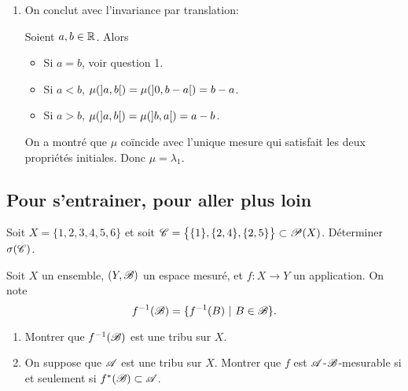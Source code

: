 {\begin{td-sol}[]
\begin{enumerate}
            On a montré que \(\mu(\fo{0,x})=x\) pour tout \(x\in\R_+^*\).

            \item On conclut avec l'invariance par translation:

            Soient \(a,b\in\mathbb{R}\). Alors
            \begin{itemize}
                \item Si \(a=b\), voir question 1.
                \item Si \(a<b\), \(\mu(\mathopen{}\left]a,b\right[\mathclose{})=\mu(\mathopen{}\left]0,b-a\right[\mathclose{})=b-a\).
                \item Si \(a>b\), \(\mu(\mathopen{}\left]a,b\right[\mathclose{})=\mu(\mathopen{}\left]b,a\right[\mathclose{})=a-b\).
            \end{itemize}
            On a montré que \(\mu\) coïncide avec l'unique mesure qui satisfait les deux propriétés initiales.
            Donc \(\mu=\lambda_1\).
        \end{enumerate}

    \end{td-sol}
}{}

%
\subsection{Pour s'entrainer, pour aller plus loin} 
%

%

\begin{td-exo}
    Soit \(X=\{1,2,3,4,5,6\}\) et soit \(\mathscr{C}=\bigl\{\{1\},\{2,4\},\{2,5\}\bigr\}\subset\mathscr{P}(X)\). Déterminer \(\sigma(\mathscr{C})\).
\end{td-exo}

\begin{td-exo}
    Soit \(X\) un ensemble, \((Y,\mathscr{B})\) un espace mesuré, et \(f:X\to Y\) un application. On note
    \[
        f^{-1}(\mathscr{B})=\{f^{-1}(B)\ |\ B\in\mathscr{B}\}.
    \]
    \begin{enumerate}
        \item Montrer que \(f^{-1}(\mathscr{B})\) est une tribu sur \(X\).
        \item On suppose que \(\mathscr{A}\) est une tribu sur \(X\). Montrer que \(f\) est \(\mathscr{A}\)-\(\mathscr{B}\)-mesurable si et seulement si \(f^*(\mathscr{B})\subset\mathscr{A}\).
    \end{enumerate}
\end{td-exo}

